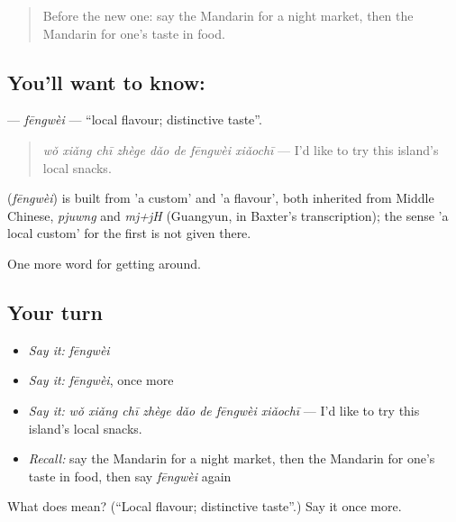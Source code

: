 \begin{quote}
Before the new one: say the Mandarin for a night market, then the Mandarin for one's taste in food.
\end{quote}

\subsection*{You'll want to know: }
\textbf{} — \emph{fēngwèi} — \textquotedblleft{}local flavour; distinctive taste\textquotedblright{}.

\begin{quote}
\textbf{} \emph{wǒ xiǎng chī zhège dǎo de fēngwèi xiǎochī} — I'd like to try this island's local snacks.
\end{quote}

\begin{cousinweb}
\textbf{} (\emph{fēngwèi}) is built from  'a custom' and  'a flavour', both inherited from Middle Chinese, \emph{pjuwng} and \emph{mj+jH} (Guangyun, in Baxter's transcription); the sense 'a local custom' for the first is not given there.
\end{cousinweb}

\begin{grammarlens}[title={What you've built}]
One more word for getting around.
\end{grammarlens}

\subsection*{Your turn}
\begin{itemize}
\raggedright
  \item \emph{Say it:} \emph{fēngwèi}
  \item \emph{Say it:} \emph{fēngwèi}, once more
  \item \emph{Say it:} \emph{wǒ xiǎng chī zhège dǎo de fēngwèi xiǎochī} — I'd like to try this island's local snacks.
  \item \emph{Recall:} say the Mandarin for a night market, then the Mandarin for one's taste in food, then say \emph{fēngwèi} again
\end{itemize}

\begin{tcolorbox}[breakable,colback=teal!4,colframe=teal!35!black,title={Before you move on}]
What does  mean? (\textquotedblleft{}Local flavour; distinctive taste\textquotedblright{}.) Say it once more.
\end{tcolorbox}
